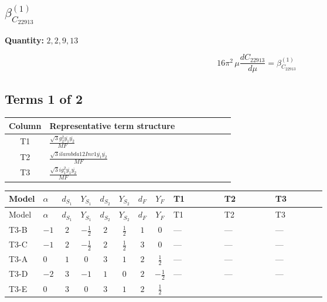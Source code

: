 \documentclass[8pt]{article}
\begin{document}
\begin{landscape}
\section*{$\beta_{C_{22913}}^{(1)}$}
\noindent\textbf{Quantity: }$\mathrm{2,2,9,13}$\par\smallskip
\[16\pi^2\,\mu\frac{d C_{22913}}{d\mu}=\beta_{C_{22913}}^{(1)}\]
\subsection*{Terms 1 of 2}
\begin{center}
\begin{tabular}{@{}c >{\raggedright\arraybackslash}p{0.82\linewidth}@{}}
\toprule
Column & Representative term structure \\
\midrule
T1 & \(\displaystyle \frac{\sqrt{3} g_{2}^{2} \overline{y_{1}} \overline{y_{2}}}{MF}\) \\
\midrule
T2 & \(\displaystyle \frac{\sqrt{3} i lambda12Inv1 \overline{y_{1}} \overline{y_{2}}}{MF}\) \\
\midrule
T3 & \(\displaystyle \frac{\sqrt{3} i g_{1}^{2} \overline{y_{1}} \overline{y_{2}}}{MF}\) \\
\midrule
\bottomrule
\end{tabular}
\end{center}
\smallskip
\tiny
\begin{longtable}{@{}llcccccc >{\raggedright\arraybackslash}p{0.21\linewidth} >{\raggedright\arraybackslash}p{0.21\linewidth} >{\raggedright\arraybackslash}p{0.21\linewidth}@{}}
\toprule
Model & $\alpha$ & $d_{S_1}$ & $Y_{S_1}$ & $d_{S_2}$ & $Y_{S_2}$ & $d_F$ & $Y_F$ & T1 & T2 & T3 \\
\midrule
\endfirsthead
\toprule
Model & $\alpha$ & $d_{S_1}$ & $Y_{S_1}$ & $d_{S_2}$ & $Y_{S_2}$ & $d_F$ & $Y_F$ & T1 & T2 & T3 \\
\midrule
\endhead
T3-B & $-1$ & $2$ & $-\frac{1}{2}$ & $2$ & $\frac{1}{2}$ & $1$ & $0$ & --- & --- & --- \\
\midrule
T3-C & $-1$ & $2$ & $-\frac{1}{2}$ & $2$ & $\frac{1}{2}$ & $3$ & $0$ & --- & --- & --- \\
\midrule
T3-A & $0$ & $1$ & $0$ & $3$ & $1$ & $2$ & $\frac{1}{2}$ & --- & --- & --- \\
\midrule
T3-D & $-2$ & $3$ & $-1$ & $1$ & $0$ & $2$ & $-\frac{1}{2}$ & --- & --- & --- \\
\midrule
T3-E & $0$ & $3$ & $0$ & $3$ & $1$ & $2$ & $\frac{1}{2}$ & \scriptsize\adjustbox{max width=\linewidth}{$\begin{gathered} - \frac{\sqrt{3} g_{2}^{2} \overline{y_{1}} \overline{y_{2}}}{6 MF}\end{gathered}$} & \scriptsize\adjustbox{max width=\linewidth}{$\begin{gathered} - \frac{\sqrt{3} i lambda12Inv1 \overline{y_{1}} \overline{y_{2}}}{6 MF}\end{gathered}$} & \scriptsize\adjustbox{max width=\linewidth}{$\begin{gathered} \frac{\sqrt{3} i g_{1}^{2} \overline{y_{1}} \overline{y_{2}}}{8 MF}\end{gathered}$} \\

\end{longtable}
\end{landscape}
\end{document}
